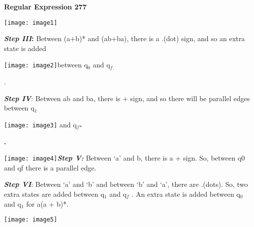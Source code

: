 

\noindent 

\noindent 

\noindent 

\noindent 

\noindent \textbf{}

\noindent \textbf{Regular Expression {\textbar}  277}

\noindent \texttt{[image: image1]}\textbf{}

\noindent \textbf{}

\noindent \textbf{}

\noindent \textbf{\textit{Step III}:} Between (a+b)* and (ab+ba), there is a .(dot) sign, and so an extra state is added

\noindent \texttt{[image: image2]}between q${}_{0}$ and q${}_{f}$${}_{.}$   

\noindent .\textbf{}

\noindent \textbf{}

\noindent \textbf{}

\noindent \textbf{\textit{Step IV}}: Between ab and ba, there is + sign, and so there will be parallel edges between q${}_{1}$

\noindent \texttt{[image: image3]}      and q${}_{f}$${}_{*}$

\noindent \textbf{.}

\noindent \textbf{}

\noindent \texttt{[image: image4]}\textbf{\textit{Step V:}} Between `a' and b, there is a + sign. So, between q0 and qf there is a parallel edge. 

\noindent \textbf{}

\noindent \textbf{}

\noindent \textbf{}

\noindent \textbf{\textit{Step VI}}: Between `a' and `b' and between `b' and `a', there are .(dots). So, two extra states are added between q${}_{1}$ and q${}_{f}$ . An extra state is added between q${}_{0}$ and q${}_{1}$ for a(a + b)*.\textbf{}

\noindent \texttt{[image: image5]}\textbf{}

